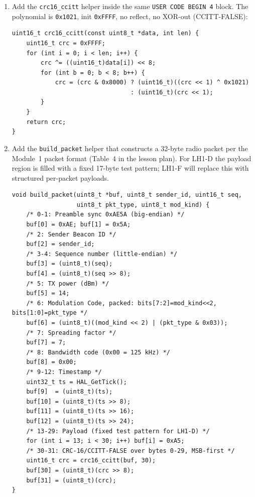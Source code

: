 \documentclass[11pt,letterpaper]{article}
\begin{document}
\begin{enumerate}[leftmargin=2em]
\begin{verbatim}
void rfm_set_mode_rx(void) {
    /* Reset FIFO RX pointer and enter RXCONTINUOUS */
    rfm_write_reg(0x0D, rfm_read_reg(0x0F));  // RegFifoAddrPtr = RxBase
    rfm_write_reg(0x12, 0xFF);                 // Clear all IRQ flags
    rfm_write_reg(0x01, 0x85);                 // LoRa RXCONTINUOUS
}
/* USER CODE END 4 */
\end{verbatim}

	\item Add the \texttt{crc16\_ccitt} helper inside the same \texttt{USER CODE BEGIN 4} block. The polynomial is \texttt{0x1021}, init \texttt{0xFFFF}, no reflect, no XOR-out (CCITT-FALSE):
\begin{verbatim}
uint16_t crc16_ccitt(const uint8_t *data, int len) {
    uint16_t crc = 0xFFFF;
    for (int i = 0; i < len; i++) {
        crc ^= ((uint16_t)data[i]) << 8;
        for (int b = 0; b < 8; b++) {
            crc = (crc & 0x8000) ? (uint16_t)((crc << 1) ^ 0x1021)
                                 : (uint16_t)(crc << 1);
        }
    }
    return crc;
}
\end{verbatim}

	\item Add the \texttt{build\_packet} helper that constructs a 32-byte radio packet per the Module~1 packet format (Table~4 in the lesson plan). For LH1-D the payload region is filled with a fixed 17-byte test pattern; LH1-F will replace this with structured per-packet payloads.
\begin{verbatim}
void build_packet(uint8_t *buf, uint8_t sender_id, uint16_t seq,
                  uint8_t pkt_type, uint8_t mod_kind) {
    /* 0-1: Preamble sync 0xAE5A (big-endian) */
    buf[0] = 0xAE; buf[1] = 0x5A;
    /* 2: Sender Beacon ID */
    buf[2] = sender_id;
    /* 3-4: Sequence number (little-endian) */
    buf[3] = (uint8_t)(seq);
    buf[4] = (uint8_t)(seq >> 8);
    /* 5: TX power (dBm) */
    buf[5] = 14;
    /* 6: Modulation Code, packed: bits[7:2]=mod_kind<<2, bits[1:0]=pkt_type */
    buf[6] = (uint8_t)((mod_kind << 2) | (pkt_type & 0x03));
    /* 7: Spreading factor */
    buf[7] = 7;
    /* 8: Bandwidth code (0x00 = 125 kHz) */
    buf[8] = 0x00;
    /* 9-12: Timestamp */
    uint32_t ts = HAL_GetTick();
    buf[9]  = (uint8_t)(ts);
    buf[10] = (uint8_t)(ts >> 8);
    buf[11] = (uint8_t)(ts >> 16);
    buf[12] = (uint8_t)(ts >> 24);
    /* 13-29: Payload (fixed test pattern for LH1-D) */
    for (int i = 13; i < 30; i++) buf[i] = 0xA5;
    /* 30-31: CRC-16/CCITT-FALSE over bytes 0-29, MSB-first */
    uint16_t crc = crc16_ccitt(buf, 30);
    buf[30] = (uint8_t)(crc >> 8);
    buf[31] = (uint8_t)(crc);
}
\end{verbatim}


\end{enumerate}
\end{document}
